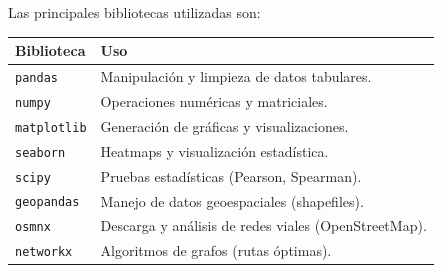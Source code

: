 \documentclass[12pt, a4paper]{article}
\begin{document}
Las principales bibliotecas utilizadas son:

\begin{table}[h!]
\centering
\small
\begin{tabular}{l l}
\toprule
\textbf{Biblioteca} & \textbf{Uso} \\
\midrule
\texttt{pandas} & Manipulación y limpieza de datos tabulares. \\
\texttt{numpy} & Operaciones numéricas y matriciales. \\
\texttt{matplotlib} & Generación de gráficas y visualizaciones. \\
\texttt{seaborn} & Heatmaps y visualización estadística. \\
\texttt{scipy} & Pruebas estadísticas (Pearson, Spearman). \\
\texttt{geopandas} & Manejo de datos geoespaciales (shapefiles). \\
\texttt{osmnx} & Descarga y análisis de redes viales (OpenStreetMap). \\
\texttt{networkx} & Algoritmos de grafos (rutas óptimas). \\
\bottomrule
\end{tabular}
\end{table}
\end{document}
